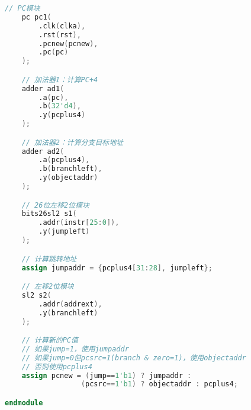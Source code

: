 \begin{lstlisting}[language=Verilog]
    // PC模块
    pc pc1(
        .clk(clka),
        .rst(rst),
        .pcnew(pcnew),
        .pc(pc)
    );

    // 加法器1：计算PC+4
    adder ad1(
        .a(pc),
        .b(32'd4),
        .y(pcplus4)
    );

    // 加法器2：计算分支目标地址
    adder ad2(
        .a(pcplus4),
        .b(branchleft),
        .y(objectaddr)
    );

    // 26位左移2位模块
    bits26sl2 s1(
        .addr(instr[25:0]),
        .y(jumpleft)
    );

    // 计算跳转地址
    assign jumpaddr = {pcplus4[31:28], jumpleft};

    // 左移2位模块
    sl2 s2(
        .addr(addrext),
        .y(branchleft)
    );

    // 计算新的PC值
    // 如果jump=1，使用jumpaddr
    // 如果jump=0但pcsrc=1(branch & zero=1)，使用objectaddr
    // 否则使用pcplus4
    assign pcnew = (jump==1'b1) ? jumpaddr : 
                  (pcsrc==1'b1) ? objectaddr : pcplus4;

endmodule
\end{lstlisting}
